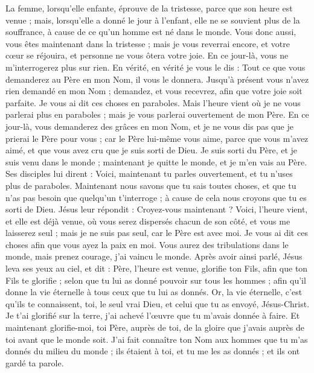 \begin{multicols}{2}
La femme, lorsqu'elle enfante, éprouve de la tristesse, parce que son heure est venue ; mais, lorsqu'elle a donné le jour à l'enfant, elle ne se souvient plus de la souffrance, à cause de ce qu'un homme est né dans le monde.
Vous donc aussi, vous êtes maintenant dans la tristesse ; mais je vous reverrai encore, et votre cœur se réjouira, et personne ne vous ôtera votre joie.
En ce jour-là, vous ne m'interrogerez plus sur rien. En vérité, en vérité je vous le dis : Tout ce que vous demanderez au Père en mon Nom, il vous le donnera.
Jusqu'à présent vous n'avez rien demandé en mon Nom ; demandez, et vous recevrez, afin que votre joie soit parfaite.
Je vous ai dit ces choses en paraboles. Mais l'heure vient où je ne vous parlerai plus en paraboles ; mais je vous parlerai ouvertement de mon Père.
En ce jour-là, vous demanderez des grâces en mon Nom, et je ne vous dis pas que je prierai le Père pour vous ;
car le Père lui-même vous aime, parce que vous m'avez aimé, et que vous avez cru que je suis sorti de Dieu.
Je suis sorti du Père, et je suis venu dans le monde ; maintenant je quitte le monde, et je m'en vais au Père.
Ses disciples lui dirent : Voici, maintenant tu parles ouvertement, et tu n'uses plus de paraboles.
Maintenant nous savons que tu sais toutes choses, et que tu n'as pas besoin que quelqu'un t'interroge ; à cause de cela nous croyons que tu es sorti de Dieu.
Jésus leur répondit : Croyez-vous maintenant ?
Voici, l'heure vient, et elle est déjà venue, où vous serez dispersés chacun de son côté, et vous me laisserez seul ; mais je ne suis pas seul, car le Père est avec moi.
Je vous ai dit ces choses afin que vous ayez la paix en moi. Vous aurez des tribulations dans le monde, mais prenez courage, j'ai vaincu le monde.
\VerseOne{}Après avoir ainsi parlé, Jésus leva ses yeux au ciel, et dit : Père, l'heure est venue, glorifie ton Fils, afin que ton Fils te glorifie ;
selon que tu lui as donné pouvoir sur tous les hommes ; afin qu'il donne la vie éternelle à tous ceux que tu lui as donnés.
Or, la vie éternelle, c'est qu'ils te connaissent, toi, le seul vrai Dieu, et celui que tu as envoyé, Jésus-Christ.
Je t'ai glorifié sur la terre, j'ai achevé l'œuvre que tu m'avais donnée à faire.
Et maintenant glorifie-moi, toi Père, auprès de toi, de la gloire que j'avais auprès de toi avant que le monde soit.
J'ai fait connaître ton Nom aux hommes que tu m'as donnés du milieu du monde ; ils étaient à toi, et tu me les as donnés ; et ils ont gardé ta parole.

\end{multicols}
